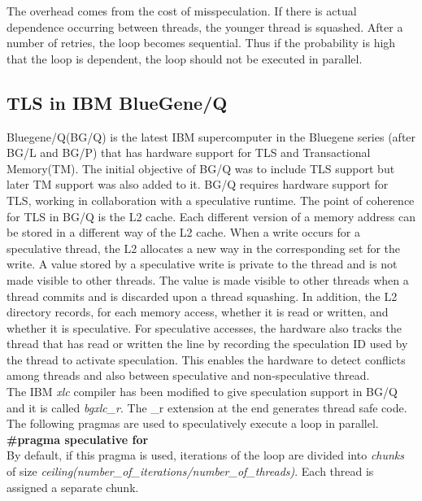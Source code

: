 \documentclass[10pt]{report}          %
\begin{document}
The overhead comes from the cost of misspeculation.  If there is actual dependence occurring between threads, the younger thread is squashed.  After a number of retries, the loop becomes sequential.  Thus if the probability is high that the loop is dependent, the loop should not be executed in parallel.
 
\subsection{TLS in IBM BlueGene/Q}

Bluegene/Q(BG/Q) is the latest IBM supercomputer in the Bluegene series (after BG/L and BG/P) that has hardware support for TLS and Transactional Memory(TM).  The initial objective of BG/Q was to include TLS support but later TM support was also added to it.  BG/Q requires hardware support for TLS, working in collaboration with a speculative runtime. The point of coherence for TLS in BG/Q is the L2 cache.  Each different version of a memory address can be stored in a different way of the L2 cache. When a write occurs for a speculative thread, the L2 allocates a new way in the corresponding set for the write. A value stored by a speculative write is private to the thread and is not made visible to other threads. The value is made visible to other threads when a thread commits and is discarded upon a thread squashing. In addition, the L2 directory records, for each memory access, whether it is read or written, and whether it is speculative. For speculative accesses, the hardware also tracks the thread that has read or written the line by recording the speculation ID used by the thread to activate speculation. This enables the hardware to detect conflicts among threads and also between speculative and non-speculative thread. \\

The IBM \textit{xlc} compiler has been modified to give speculation support in BG/Q and it is called \textit{bgxlc\_r}.  The \_r extension at the end generates thread safe code.  The following pragmas are used to speculatively execute a loop in parallel. \\

\textbf{\#pragma speculative for} \\

By default, if this pragma is used, iterations of the loop are divided into \textit{chunks} of size
\textit{ceiling(number\_of\_iterations/number\_of\_threads)}. Each thread is assigned a separate chunk.
\end{document}
